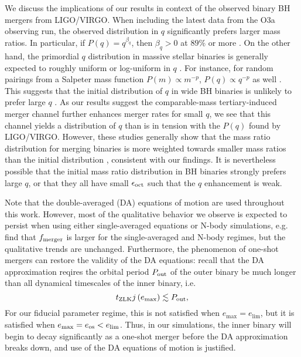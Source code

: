 \documentclass[
        fleqn,
        usenatbib,
    ]{mnras}
\newcommand*{\p}[1]{\left(#1\right)}
\begin{document}
We discuss the implications of our results in context of the observed binary BH
mergers from LIGO/VIRGO\@. When including the latest data from the O3a observing
run, the observed distribution in $q$ significantly prefers larger mass ratios.
In particular, if $P(q) = q^{\beta_q}$, then $\beta_q > 0$ at $89\%$ or more
\citep{LIGOO3a}. On the other hand, the primordial $q$ distribution in massive
stellar binaries is generally expected to roughly uniform or log-uniform in $q$
\citep[e.g.][]{sana2012binary, duchene2013, kobulnicky2014, moe2017mind}. For
instance, for random pairings from a Salpeter mass function $P(m) \propto
m^{-p}$, $P(q) \propto q^{-p}$ as well \citep[see also
Appendix~\ref{s:ratios}]{moe2017mind}. This suggests that the initial
distribution of $q$ in wide BH binaries is unlikely to prefer large $q$
\citep[for reasonable assumptions on BH remnant masses after supernovae, see
e.g.][]{farmer_bhmass}. As our results suggest the comparable-mass
tertiary-induced merger channel further enhances merger rates for small $q$, we
see that this channel yields a distribution of $q$ than is in tension with the
$P(q)$ found by LIGO/VIRGO\@. However, these studies generally show that the
mass ratio distribution for merging binaries is more weighted towards smaller
mass ratios than the initial distribution \citep{silsbee2017lidov,
fragione2019}, consistent with our findings. It is nevertheless possible that
the initial mass ratio distribution in BH binaries strongly prefers large $q$,
or that they all have small $\epsilon_{\rm oct}$ such that the $q$ enhancement
is weak.

Note that the double-averaged (DA) equations of motion are used throughout this
work. However, most of the qualitative behavior we observe is expected to
persist when using either single-averaged equations or N-body simulations, e.g.\
\citet{LL19} find that $f_{\rm merger}$ is larger for the single-averaged and
N-body regimes, but the qualitative trends are unchanged. Furthermore, the
phenomenon of one-shot mergers can restore the validity of the DA equations:
recall that the DA approximation reqires the orbital period $P_{\rm out}$ of the
outer binary be much longer than all dynamical timescales of the inner binary,
i.e.
\begin{equation}
    t_{\rm ZLK}j\p{e_{\max}} \lesssim P_{\rm out},
\end{equation}
For our fiducial parameter regime, this is not satisfied when $e_{\max} =
e_{\lim}$, but it is satisfied when $e_{\max} = e_{\rm os} < e_{\lim}$. Thus,
in our simulations, the inner binary will begin to decay significantly as a
one-shot merger before the DA approximation breaks down, and use of the DA
equations of motion is justified.
\end{document}
